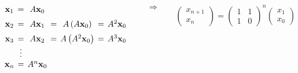 {\begin{frame}
		\vspace{-2mm}
		
		\begin{columns}[c]
			\hspace{-10mm}
			\begin{column}{0.5\textwidth}
				\[			
				\begin{array}{c@{\hspace{0.7\tabcolsep}}c@{\hspace{0.7\tabcolsep}}c@{\hspace{0.7\tabcolsep}}c@{\hspace{0.7\tabcolsep}}c@{\hspace{0.7\tabcolsep}}c@{\hspace{0.7\tabcolsep}}c}
				\mathbf{x}_1 & = & A \mathbf{x}_0  &  &  &  & \\[2mm]
				\mathbf{x}_2 & = & A \mathbf{x}_1  & = & A\left( A\mathbf{x}_0\right)  & = & A^2 \mathbf{x}_0\\[2mm]
				\mathbf{x}_3 & = & A \mathbf{x}_2  & = & A\left( A^2\mathbf{x}_0\right)  & = & A^3 \mathbf{x}_0\\[0mm]
				& \vdots &  &  &  &  & \\
				\mathbf{x}_n & = & A^n \mathbf{x}_0  &  &  &  & \\[0mm]             
				\end{array}
				\]	
			\end{column}
			\hspace{-1.2cm}
			\begin{column}{0.1\textwidth}
				\[
				\Longrightarrow
				\]
			\end{column}
			\hspace{-1cm}		
			\begin{column}{0.4\textwidth}	
				\vspace{1mm}
				\[			
				\left(
				\begin{array}{c}
				x_{n+1}   \\[1mm]
				x_{n} 
				\end{array}
				\right)
				=
				\left(
				\begin{array}{cc}
				1 & 1   \\[1mm]
				1 & 0
				\end{array}
				\right)^n
				\left(
				\begin{array}{c}
				x_{1}   \\[1mm]
				x_{0} 
				\end{array}
				\right)
				\]
			\end{column}
			
		\end{columns}
		
	\end{frame}
}

